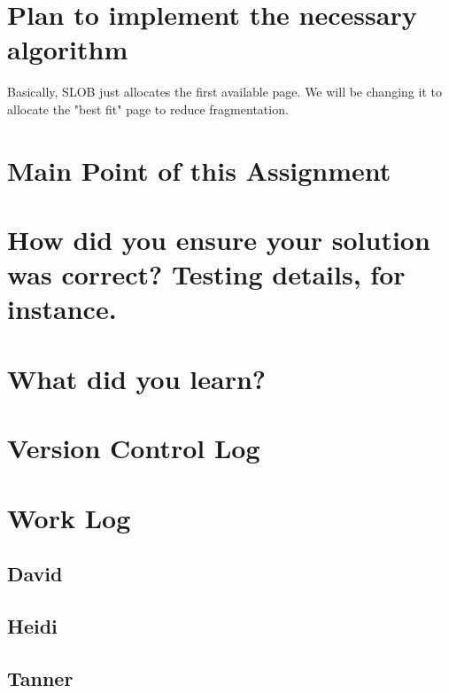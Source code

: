 \documentclass{article}
\begin{document}
\section{Plan to implement the necessary algorithm}
Basically, SLOB just allocates the first available page. We will be changing it to allocate the "best fit" page to reduce fragmentation.

\section{Main Point of this Assignment}

\section{How did you ensure your solution was correct? Testing details, for instance.}

\section{What did you learn?}

\section*{Version Control Log}

\section*{Work Log}
\subsection*{David}

\subsection*{Heidi}

\subsection{Tanner}
\end{document}
